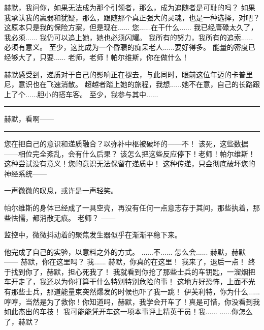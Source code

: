 \documentclass[openany]{book}
\begin{document}
\begin{dialogue}
     赫默，我问你，如果无法成为那个引领者，那么，成为追随者是可耻的吗？
     如果我承认我的羸弱和犹疑，那么，跟随那个真正强大的灵魂，也是一种选择，对吧？
     这原本只是我的保险方案，但是现在......
     您......在干什么......
     我已经庸碌太久了，我必须......
     我仍可以追上她，她也必须闪耀。
     我所有的努力，我所有的追索......必须有意义。
     至少，这比成为一个昏聩的痴呆老人......要好得多。
     能量的密度已经够大了，只要......
     老师，老师！帕尔维斯，你在做什么！\par
    赫默感受到，递质对于自己的影响正在褪去，与此同时，眼前这位年迈的卡普里尼，意识也在飞速消散。
     超越者踏上她的旅程，我想......她不在意，自己的长路跟上了个......胆小的搭车客。
     至少，我参与其中......
    \par\noindent\rule{\textwidth}{0.4pt}
     赫默，看啊——
    \par\noindent\rule{\textwidth}{0.4pt}
     您在把自己的意识和递质融合？以弥补中枢被破坏的——不！
     该死，这些数据——相位完全紊乱，会有什么后果？
     该怎么把这些反应停下！老师！帕尔维斯！
     这种尝试没有意义！您的意识无法保留在递质中！
     这种传递，只会彻底破坏您的神经系统——\par
    一声微微的叹息，或许是一声轻笑。\par
    帕尔维斯的身体已经成了一具空壳，再没有任何一点意志存于其间，那些执着，那些怯懦，都消散无痕。
     老师？
     ——\par
    监控中，微微抖动着的聚焦发生器似乎在渐渐平稳下来。\par
    他完成了自己的实验，以意料之外的方式。
     ......不......
     怎么会......
     赫默，赫默——
     赫默，你在这里吗？
     我......
     赫默，你真的在这里！
     我来了，退后一点！
     终于找到你了，赫默，担心死我了！
     我就看到你抢了那些士兵的车钥匙，一溜烟把车开走了，我还以为你打算干什么特别特别危险的事！
     这地方好恐怖，上面不光有那些士兵，那道能量束突然爆发的时候也吓了我一跳！
     伊芙利特，你为什么......
     哼哼，当然是为了救你！你知道吗，赫默，我学会开车了！真是可惜，你没看到我如此杰出的车技！
     我可能能凭开车这一项本事评上精英干员！我......
     ......你怎么了，赫默？

\end{dialogue}
\end{document}
